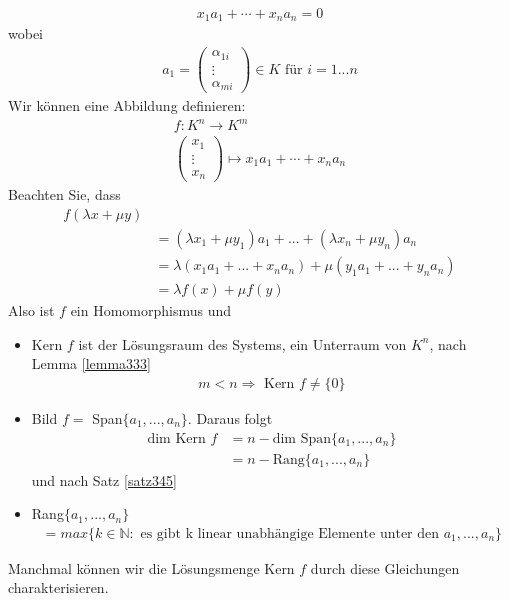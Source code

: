 \documentclass[11pt]{report}
\newcommand*\Zb[1] {\mathbb{#1}}
\begin{document}
\begin{align}
 x_1 a_1 + \cdots + x_n a_n = 0 
\end{align}
wobei 
\begin{align}
 a_1 = \begin{pmatrix}
        \alpha_{1i} \\ \vdots \\ \alpha_{mi}
       \end{pmatrix} \in K\text{ für } i=1...n
\end{align}
Wir können eine Abbildung definieren:
\begin{align}
 f: K^n \rightarrow K^m \\
 \begin{pmatrix} x_1 \\ \vdots \\ x_n\end{pmatrix} \mapsto x_1 a_1 + \cdots + x_n a_n
\end{align}
Beachten Sie, dass
\begin{align}
 f(\lambda x + \mu y) \\
 &= (\lambda x_1 + \mu y_1) a_1 + ... + (\lambda x_n + \mu y_n) a_n \\
 &= \lambda (x_1 a_1 + ... + x_n a_n) + \mu (y_1 a_1 + ... + y_n a_n) \\
 &= \lambda f(x) + \mu f(y)
\end{align}
Also ist $f$ ein Homomorphismus und 
\begin{itemize}
 \item Kern $f$ ist der Lösungsraum des Systems, ein Unterraum von $K^n$, nach Lemma \ref{lemma333}
\begin{align}
 m < n \Rightarrow \text{ Kern } f \neq \{0\}
\end{align}
\item Bild $f = $ Span$\{a_1, ..., a_n\}$. Daraus folgt
\begin{align}
 \text{dim Kern } f &= n - \text{dim Span}\{a_1, ..., a_n\} \\
  &= n - \text{Rang}\{a_1, ..., a_n\}
\end{align}
und nach Satz \ref{satz345}
\item Rang$\{a_1, ..., a_n\}$
\begin{align}
 = max \{k \in \Zb{N}:\text{ es gibt k linear unabhängige Elemente unter den } a_1, ..., a_n\}
\end{align}
\end{itemize}
Manchmal können wir die Lösungsmenge Kern $f$ durch diese Gleichungen charakterisieren.
\end{document}
